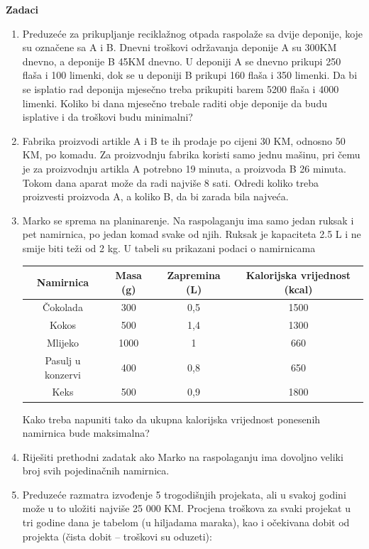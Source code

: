 \documentclass[a4paper, utf8, 11pt, colorlinks]{book}
\begin{document}
\textbf{\large Zadaci}
\begin{enumerate}
	
	\item Preduzeće za prikupljanje reciklažnog otpada raspolaže sa dvije deponije, koje su označene sa A i B. Dnevni troškovi održavanja deponije A su 300KM dnevno, a deponije B 45KM dnevno.  U deponiji A se dnevno prikupi 250 flaša i 100 limenki, dok se u deponiji B prikupi 160 flaša i 350 limenki. Da bi se isplatio rad deponija mjesečno treba prikupiti barem 5200 flaša i 4000 limenki.
	Koliko bi dana mjesečno trebale raditi obje deponije da budu isplative i da troškovi budu minimalni?
	
	\item Fabrika proizvodi artikle A i B te ih prodaje po cijeni 30 KM, odnosno 50 KM, po komadu. Za
	proizvodnju fabrika koristi samo jednu mašinu, pri čemu je za proizvodnju artikla A potrebno 19
	minuta, a proizvoda B 26 minuta. Tokom dana aparat može da radi najviše 8 sati. Odredi koliko treba
	proizvesti proizvoda A, a koliko B, da bi zarada bila najveća.
	
	\item Marko se sprema na planinarenje. Na raspolaganju ima samo jedan ruksak i pet namirnica, po jedan
	komad svake od njih. Ruksak je kapaciteta 2.5 L i ne smije biti teži od 2 kg. U tabeli su
	prikazani podaci o namirnicama
	\begin{table}
		\begin{tabular}{|c|c|c|c|}
			\hline
			Namirnica & Masa (g) & Zapremina (L) & Kalorijska vrijednost (kcal) \\
			\hline
			Čokolada & 300 & 0,5 & 1500 \\
			\hline
			Kokos & 500 & 1,4 & 1300 \\
			\hline
			Mlijeko& 1000 & 1 & 660 \\
			\hline
			Pasulj u konzervi& 400 & 0,8 & 650 \\
			\hline
			Keks& 500 & 0,9 & 1800 \\
			\hline
		\end{tabular}
	\end{table}
	Kako treba napuniti tako da ukupna kalorijska vrijednost ponesenih namirnica bude maksimalna?
	
	\item Riješiti prethodni zadatak ako Marko na raspolaganju ima dovoljno veliki broj svih pojedinačnih namirnica.
	
	
	\item Preduzeće  razmatra izvođenje 5 trogodišnjih projekata, ali u svakoj godini može u to uložiti najviše
	25 000 KM. Procjena troškova za svaki projekat u tri godine dana je tabelom (u hiljadama maraka), kao i
	očekivana dobit od projekta (čista dobit – troškovi su oduzeti):
	

\end{enumerate}
\end{document}
